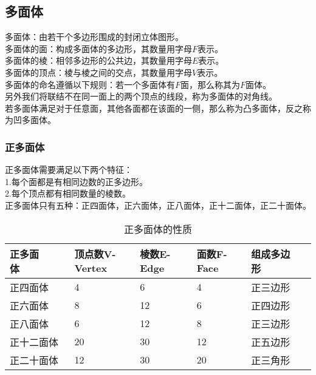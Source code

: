 \documentclass[UTF8]{ctexart}
\begin{document}
\subsection{多面体}
    多面体：由若干个多边形围成的封闭立体图形。\\[3mm]
    多面体的面：构成多面体的多边形，其数量用字母$F$表示。\\[3mm]
    多面体的棱：相邻多边形的公共边，其数量用字母$E$表示。\\[3mm]
    多面体的顶点：棱与棱之间的交点，其数量用字母$V$表示。\\[3mm]
    多面体的命名遵循以下规则：若一个多面体有$F$面，那么称其为$F$面体。\\[3mm]
    另外我们将联结不在同一面上的两个顶点的线段，称为多面体的对角线。\\[3mm]
    若多面体满足对于任意面，其他各面都在该面的一侧，那么称为凸多面体，反之称为凹多面体。

\subsubsection{正多面体}
    正多面体需要满足以下两个特征：\\[3mm]
    1.每个面都是有相同边数的正多边形。\\[3mm]
    2.每个顶点都有相同数量的棱数。\\[5mm]
    正多面体只有五种：正四面体，正六面体，正八面体，正十二面体，正二十面体。\vspace{5pt}
    \begin{table}[h]
        \begin{center}
            \begin{tabular}{l|l|l|l|l}
                \hline
                正多面体~~~~~~~~&顶点数V-Vertex~~~~&棱数E-Edge~~~~&面数F-Face~~~~&组成多边形~~~~~~~~\\ \hline
                正四面体&4&6&4&正三边形\\ \hline
                正六面体&8&12&6&正四边形\\ \hline
                正八面体&6&12&8&正三边形\\ \hline
                正十二面体&20&30&12&正五边形\\ \hline
                正二十面体&12&30&20&正三角形\\ \hline
            \end{tabular}
            \caption{正多面体的性质}
        \end{center}
    \end{table}\vspace{-20pt}
\end{document}
